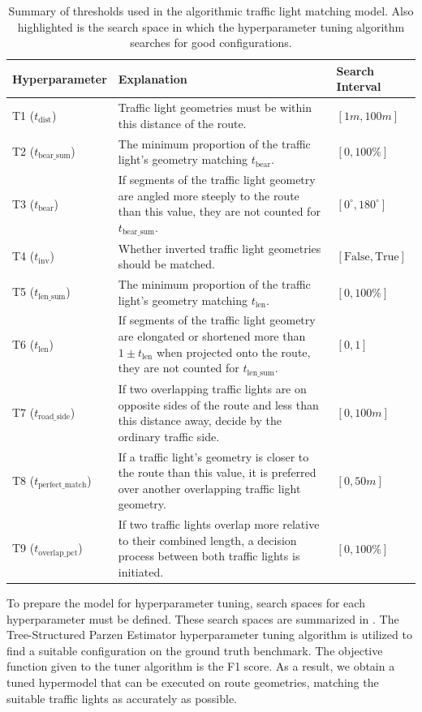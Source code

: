 \begin{table}[!b]
\caption{Summary of thresholds used in the algorithmic traffic light matching model. Also highlighted is the search space in which the hyperparameter tuning algorithm searches for good configurations.}
\begin{tabular}{@{}lp{8cm}l@{}}
\toprule
\textbf{Hyperparameter}  & \textbf{Explanation} & \textbf{Search Interval} \\
\midrule
T1 ($t_{\text{dist}}$) & Traffic light geometries must be within this distance of the route. & $[1m, 100m]$ \\
T2 ($t_{\text{bear\_sum}}$) & The minimum proportion of the traffic light's geometry matching $t_{\text{bear}}$. & $[0, 100\%]$ \\
T3 ($t_{\text{bear}}$) & If segments of the traffic light geometry are angled more steeply to the route than this value, they are not counted for $t_{\text{bear\_sum}}$. & $[0^{\circ}, 180^{\circ}]$ \\
T4 ($t_{\text{inv}}$) & Whether inverted traffic light geometries should be matched. & $[\text{False}, \text{True}]$ \\
T5 ($t_{\text{len\_sum}}$) & The minimum proportion of the traffic light's geometry matching $t_{\text{len}}$. & $[0, 100\%]$ \\
T6 ($t_{\text{len}}$) & If segments of the traffic light geometry are elongated or shortened more than $1 \pm t_{\text{len}}$ when projected onto the route, they are not counted for $t_{\text{len\_sum}}$. & $[0, 1]$\\
T7 ($t_{\text{road\_side}}$) & If two overlapping traffic lights are on opposite sides of the route and less than this distance away, decide by the ordinary traffic side. & $[0, 100m]$ \\
T8 ($t_{\text{perfect\_match}}$) & If a traffic light's geometry is closer to the route than this value, it is preferred over another overlapping traffic light geometry. & $[0, 50m]$ \\
T9 ($t_{\text{overlap\_pct}}$) & If two traffic lights overlap more relative to their combined length, a decision process between both traffic lights is initiated. & $[0, 100\%]$ \\
\bottomrule
\end{tabular}
\label{tab:hyperparameter-space}
\end{table}

To prepare the model for hyperparameter tuning, search spaces for each hyperparameter must be defined. These search spaces are summarized in . The Tree-Structured Parzen Estimator hyperparameter tuning algorithm \cite{ozaki_multiobjective_2020} is utilized to find a suitable configuration on the ground truth benchmark. The objective function given to the tuner algorithm is the F1 score. As a result, we obtain a tuned hypermodel that can be executed on route geometries, matching the suitable traffic lights as accurately as possible.

